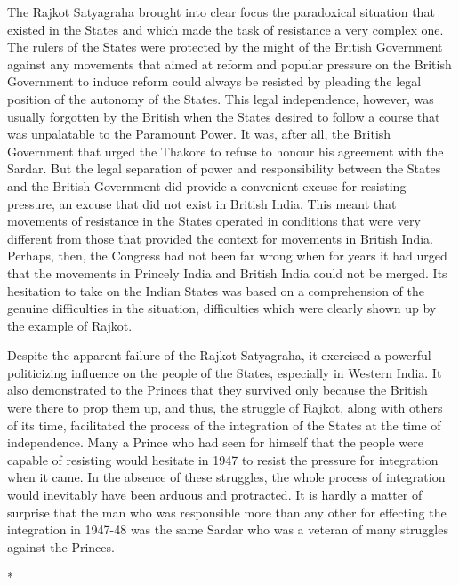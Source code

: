 The Rajkot Satyagraha brought into clear focus the paradoxical situation that existed in the States and which made the task of resistance a very complex one. The rulers of the States were protected by the might of the British Government against any movements that aimed at reform and popular pressure on the British Government to induce reform could always be resisted by pleading the legal position of the autonomy of the States. This legal independence, however, was usually forgotten by the British when the States desired to follow a course that was unpalatable to the Paramount Power. It was, after all, the British Government that urged the Thakore to refuse to honour his agreement with the Sardar. But the legal separation of power and responsibility between the States and the British Government did provide a convenient excuse for resisting pressure, an excuse that did not exist in British India. This meant that movements of resistance in the States operated in conditions that were very different from those that provided the context for movements in British India. Perhaps, then, the Congress had not been far wrong when for years it had urged that the movements in Princely India and British India could not be merged. Its hesitation to take on the Indian States was based on a comprehension of the genuine difficulties in the situation, difficulties which were clearly shown up by the example of Rajkot. 

Despite the apparent failure of the Rajkot Satyagraha, it exercised a powerful politicizing influence on the people of the States, especially in Western India. It also demonstrated to the Princes that they survived only because the British were there to prop them up, and thus, the struggle of Rajkot, along with others of its time, facilitated the process of the integration of the States at the time of independence. Many a Prince who had seen for himself that the people were capable of resisting would hesitate in 1947 to resist the pressure for integration when it came. In the absence of these struggles, the whole process of integration would inevitably have been arduous and protracted. It is hardly a matter of surprise that the man who was responsible more than any other for effecting the integration in 1947-48 was the same Sardar who was a veteran of many struggles against the Princes.

\begin{center}*\end{center}

